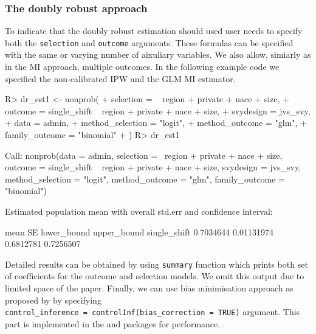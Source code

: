 \documentclass[
]{jss}
\begin{document}
\subsubsection{The doubly robust
approach}\label{the-doubly-robust-approach}

To indicate that the doubly robust estimation should used user needs to
specify both the \texttt{selection} and \texttt{outcome} arguments.
These formulas can be specified with the same or varying number of
aixuliary variables. We also allow, simiarly as in the MI approach,
multiple outcomes. In the following example code we specified the
non-calibrated IPW and the GLM MI estimator.

\begin{CodeChunk}
\begin{CodeInput}
R> dr_est1 <- nonprob(
+   selection = ~ region + private + nace + size,
+   outcome = single_shift ~ region + private + nace + size,
+   svydesign = jvs_svy,
+   data = admin,
+   method_selection = "logit",
+   method_outcome = "glm",
+   family_outcome = "binomial"
+ )
R> dr_est1
\end{CodeInput}
\begin{CodeOutput}

Call:
nonprob(data = admin, selection = ~region + private + nace + 
    size, outcome = single_shift ~ region + private + nace + 
    size, svydesign = jvs_svy, method_selection = "logit", method_outcome = "glm", 
    family_outcome = "binomial")

Estimated population mean with overall std.err and confidence interval:

                  mean         SE lower_bound upper_bound
single_shift 0.7034644 0.01131974   0.6812781   0.7256507
\end{CodeOutput}
\end{CodeChunk}

Detailed results can be obtained by using \texttt{summary} function
which prints both set of coefficients for the outcome and selection
models. We omit this output due to limited space of the paper. Finally,
we can use bias minimisation approach as proposed by
\citet{yang_doubly_2020} by specifying
\texttt{control\_inference\ =\ controlInf(bias\_correction\ =\ TRUE)}
argument. This part is implemented in the  and
 packages for performance.
\end{document}
